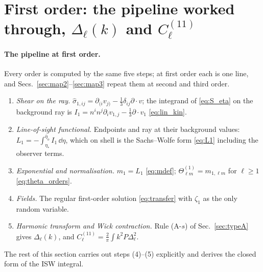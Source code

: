 \section{First order: the pipeline worked through, \texorpdfstring{$\Delta_\ell(k)$}{Delta_l(k)} and \texorpdfstring{$C_\ell^{(11)}$}{C11}}\label{sec:linear}

\paragraph{The pipeline at first order.}  Every order is computed by the same five steps; at first order each is one line, and
Secs.~\ref{sec:map2}--\ref{sec:map3} repeat them at second and third order.
\begin{enumerate}\itemsep1pt
\item[(1)] \emph{Shear on the ray.}  $\hat\sigma_{1,ij}=\partial_{(i}v_{j)}-\tfrac13\delta_{ij}\partial\cdot v$; the integrand of \eqref{eq:S_eta} on the background ray
is $I_1=n^in^j\partial_iv_{1,j}-\tfrac13\partial\cdot v_1$ \eqref{eq:lin_kin}.
\item[(2)] \emph{Line-of-sight functional.}  Endpoints and ray at their background values: $L_1=-\int_{\eta_*}^{\bar\eta_o}I_1\,\dd\eta$, which on shell is the
Sachs--Wolfe form \eqref{eq:L1} including the observer terms.
\item[(3)] \emph{Exponential and normalisation.}  $m_1=L_1$ \eqref{eq:mdef}; $\Theta^{(1)}_{\ell m}=m_{1,\ell m}$ for $\ell\ge1$ \eqref{eq:theta_orders}.
\item[(4)] \emph{Fields.}  The regular first-order solution \eqref{eq:transfer} with $\zeta_1$ as the only random variable.
\item[(5)] \emph{Harmonic transform and Wick contraction.}  Rule (A-$s$) of Sec.~\ref{sec:typeA} gives $\Delta_\ell(k)$, and $C^{(11)}_\ell=\frac2\pi\int k^2P\Delta_\ell^2$.
\end{enumerate}
The rest of this section carries out steps (4)--(5) explicitly and derives the closed form of the ISW integral.

